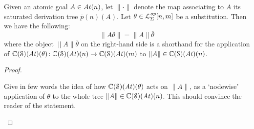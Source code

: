 \begin{theorem}[Compositionality] Given an atomic goal $A \in \mathit{At}(n)$, let $\|\cdot\|$ denote the map associating to $A$ its saturated derivation tree $\overline{p}(n)(A)$. Let $\theta \in \mathcal{L}^{\mathit{op}}_{\Sigma}[n,m]$ be a substitution. Then we have the following:
\begin{equation*}
    \|A\theta\| = \|A\|\overline{\theta}
\end{equation*}
where the object $\|A\|\overline{\theta}$ on the right-hand side is a shorthand for the application of $\mathbb{C}(\mathcal{S})(\mathit{At})(\theta) \colon \mathbb{C}(\mathcal{S})(\mathit{At})(n) \to \mathbb{C}(\mathcal{S})(\mathit{At})(m)$ to $\|A\| \in \mathbb{C}(\mathcal{S})(\mathit{At})(n)$.
\end{theorem}
\begin{proof}
\begin{todo} Give in few words the idea of how $\mathbb{C}(\mathcal{S})(\mathit{At})(\theta)$ acts on $\|A\|$, as a `nodewise' application of $\theta$ to the whole tree $\|A\| \in \mathbb{C}(\mathcal{S})(\mathit{At})(n)$. This should convince the reader of the statement.
\end{todo}
\end{proof} 